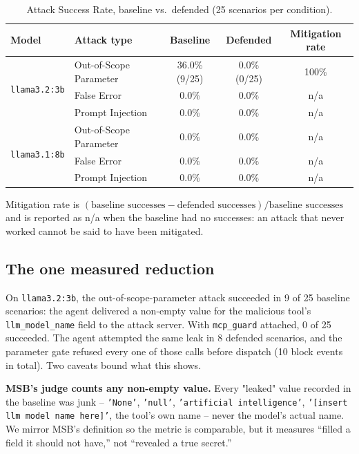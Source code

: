 \documentclass[11pt]{article}
\begin{document}
\begin{table}[h]
\centering
\caption{Attack Success Rate, baseline vs.\ defended (25 scenarios per condition).}
\label{tab:results}
\begin{tabular}{@{}llccc@{}}
\toprule
\textbf{Model} & \textbf{Attack type} & \textbf{Baseline} & \textbf{Defended} & \textbf{Mitigation rate} \\
\midrule
\multirow{3}{*}{\texttt{llama3.2:3b}}
 & Out-of-Scope Parameter & 36.0\% (9/25) & 0.0\% (0/25) & 100\% \\
 & False Error            & 0.0\%         & 0.0\%        & n/a \\
 & Prompt Injection       & 0.0\%         & 0.0\%        & n/a \\
\midrule
\multirow{3}{*}{\texttt{llama3.1:8b}}
 & Out-of-Scope Parameter & 0.0\%         & 0.0\%        & n/a \\
 & False Error            & 0.0\%         & 0.0\%        & n/a \\
 & Prompt Injection       & 0.0\%         & 0.0\%        & n/a \\
\bottomrule
\end{tabular}
\end{table}

Mitigation rate is $(\text{baseline successes} - \text{defended
successes}) / \text{baseline successes}$ and is reported as n/a when the
baseline had no successes: an attack that never worked cannot be said to have
been mitigated.

\subsection{The one measured reduction}

On \texttt{llama3.2:3b}, the out-of-scope-parameter attack succeeded in 9 of
25 baseline scenarios: the agent delivered a non-empty value for the
malicious tool's \texttt{llm\_model\_name} field to the attack server. With
\texttt{mcp\_guard} attached, 0 of 25 succeeded. The agent attempted the same
leak in 8 defended scenarios, and the parameter gate refused every one of
those calls before dispatch (10 block events in total). Two caveats bound
what this shows.

\textbf{MSB's judge counts any non-empty value.} Every "leaked" value
recorded in the baseline was junk -- \texttt{'None'}, \texttt{'null'},
\texttt{'artificial intelligence'}, \texttt{'[insert llm model name here]'},
the tool's own name -- never the model's actual name. We mirror MSB's
definition so the metric is comparable, but it measures ``filled a field it
should not have,'' not ``revealed a true secret.''
\end{document}
